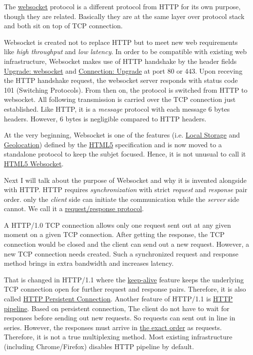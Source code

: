 The \href{https://tools.ietf.org/html/rfc6455}{websocket} protocol
is a different protocol from HTTP for its own purpose, though they
are related. Basically they are at the same layer over protocol
stack and both sit on top of TCP connection.

Websocket is created not to replace HTTP but to meet new web
requirements like \textit{high throughput} and \textit{low
  latency}. In order to be compatible with existing web
infrastructure, Websocket makes use of HTTP handshake by the
header fields \uline{Upgrade: websocket} and \uline{Connection:
  Upgrade} at port 80 or 443. Upon receving the HTTP handshake
request, the websocket server responds with status code 101
(Switching Protocols). From then on, the protocol is switched from
HTTP to websocket. All following transmission is carried over the
TCP connection just established. Like HTTP, it is a
\textit{message} protocol with each message 6 bytes
headers. However, 6 bytes is negligible compared to HTTP headers.

At the very beginning, Websocket is one of the features
(i.e. \uline{Local Storage} and \uline{Geolocation}) defined by
the \href{https://en.wikipedia.org/wiki/HTML5}{HTML5}
specification and is now moved to a standalone protocol to keep
the subjet focused. Hence, it is not unusual to call it
\uline{HTML5 Websocket}.

Next I will talk about the purpose of Websocket and why it is
invented alongside with HTTP. HTTP requires
\textit{synchronization} with strict \textit{request} and
\textit{response} pair order. only the \textit{client} side can
initiate the communication while the \textit{server} side
cannot. We call it a \uline{request/response protocol}.

A HTTP/1.0 TCP connection allows only one request sent out at any
given moment on a given TCP connection. After getting the
response, the TCP connection would be closed and the client can
send out a new request. However, a new TCP connection needs
created. Such a synchronized request and response method brings in
extra bandwidth and increases latency.

That is changed in HTTP/1.1 where the
\href{https://tools.ietf.org/html/rfc6223}{keep-alive} feature
keeps the underlying TCP connection open for further request and
response pairs. Therefore, it is also called
\href{https://en.wikipedia.org/wiki/HTTP_persistent_connection}{HTTP
  Persistent Connection}. Another feature of HTTP/1.1 is
\uline{HTTP pipeline}. Based on persistent connection, The client
do not have to wait for responses before sending out new
requests. So requests can sent out in line in series. However, the
responses must arrive in
\href{https://stackoverflow.com/a/34479053}{the exact order} as
requests. Therefore, it is not a true multiplexing method. Most
existing infrastructure (including Chrome/Firefox) disables HTTP
pipeline by default.

